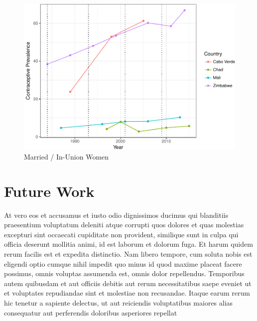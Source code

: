 \documentclass[11pt,]{article}
\makeatletter
\def\maxwidth{\ifdim\Gin@nat@width>\linewidth\linewidth
\else\Gin@nat@width\fi}
\let\Oldincludegraphics\includegraphics
\renewcommand{\includegraphics}[1]{\Oldincludegraphics[width=\maxwidth]{#1}}
\makeatother
\begin{document}
\begin{figure}
\centering
\includegraphics{final-paper_files/figure-latex/unnamed-chunk-2-1.pdf}
\caption{Married / In-Union Women}
\end{figure}

\section{Future Work}\label{future-work}

At vero eos et accusamus et iusto odio dignissimos ducimus qui
blanditiis praesentium voluptatum deleniti atque corrupti quos dolores
et quas molestias excepturi sint occaecati cupiditate non provident,
similique sunt in culpa qui officia deserunt mollitia animi, id est
laborum et dolorum fuga. Et harum quidem rerum facilis est et expedita
distinctio. Nam libero tempore, cum soluta nobis est eligendi optio
cumque nihil impedit quo minus id quod maxime placeat facere possimus,
omnis voluptas assumenda est, omnis dolor repellendus. Temporibus autem
quibusdam et aut officiis debitis aut rerum necessitatibus saepe eveniet
ut et voluptates repudiandae sint et molestiae non recusandae. Itaque
earum rerum hic tenetur a sapiente delectus, ut aut reiciendis
voluptatibus maiores alias consequatur aut perferendis doloribus
asperiores repellat

\newpage
\singlespacing 
\end{document}
